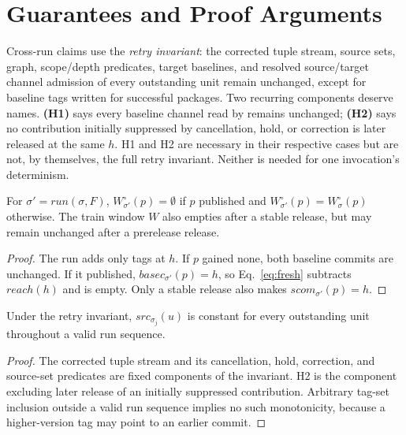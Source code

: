 \section{Guarantees and Proof Arguments}
\label{sec:guarantees}

Cross-run claims use the \emph{retry invariant}: the corrected tuple
stream, source sets, graph, scope/depth predicates, target baselines, and
resolved source/target channel admission of every outstanding unit remain
unchanged, except for baseline tags written for successful packages.
Two recurring components deserve names. \textbf{(H1)} says every baseline
channel read by  remains unchanged;
\textbf{(H2)} says no contribution initially suppressed by cancellation,
hold, or correction is later released at the same $h$. H1 and H2 are
necessary in their respective cases but are not, by themselves, the full
retry invariant. Neither is needed for one invocation's determinism.

\begin{lemma}
\label{lem:w}
For $\sigma' = \mathit{run}(\sigma,F)$, $W^\circ_{\sigma'}(p)=\emptyset$
if $p$ published and $W^\circ_{\sigma'}(p)=W^\circ_\sigma(p)$ otherwise.
The train window $W$ also empties after a stable release, but may remain
unchanged after a prerelease release.
\end{lemma}
\begin{proof}
The run adds only tags at $h$. If $p$ gained none, both baseline commits
are unchanged. If it published, $\mathit{basec}_{\sigma'}(p)=h$, so
Eq.~\ref{eq:fresh} subtracts $\mathit{reach}(h)$ and is empty. Only a
stable release also makes $\mathit{scom}_{\sigma'}(p)=h$.
\end{proof}

\begin{lemma}
\label{lem:s}
Under the retry invariant, $\mathit{src}_{\sigma_j}(u)$ is constant for
every outstanding unit throughout a valid run sequence.
\end{lemma}
\begin{proof}
The corrected tuple stream and its cancellation, hold, correction, and
source-set predicates are fixed components of the invariant. H2 is the
component excluding later release of an initially suppressed contribution.
Arbitrary tag-set inclusion outside a valid run sequence implies no such
monotonicity, because a higher-version tag may point to an earlier commit.
\end{proof}

